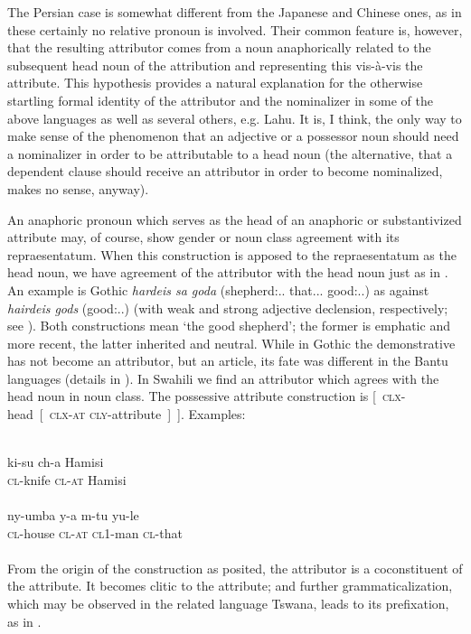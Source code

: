 The Persian case is somewhat different from the Japanese and Chinese ones, as in these certainly no relative pronoun is involved. Their common feature is, however, that the resulting attributor comes from a noun anaphorically related to the subsequent head noun of the attribution and representing this vis-à-vis the attribute. This hypothesis provides a natural explanation for the otherwise startling formal identity of the attributor and the nominalizer in some of the above languages as well as several others, e.g. Lahu. It is, I think, the only way to make sense of the phenomenon that an adjective or a possessor noun should need a nominalizer in order to be attributable to a head noun (the alternative, that a dependent clause should receive an attributor in order to become nominalized, makes no sense, anyway).

An anaphoric pronoun which serves as the head of an anaphoric or substantivized attribute may, of course, show gender or noun class agreement with its repraesentatum. When this construction is apposed to the repraesentatum as the head noun, we have agreement of the attributor with the head noun just as in . An example is Gothic \textit{hardeis sa goda} (shepherd:\textsc{\glnom.\glsg.\glm} that.\textsc{\glnom.\glsg.\glm} good:\textsc{\glnom.\glsg.\glm}) as against \textit{hairdeis gods} (good:\textsc{\glnom.\glsg.\glm}) (with weak and strong adjective declension, respectively; see \citealt[110]{Ramat1980}). Both constructions mean ‘the good shepherd’; the former is emphatic and more recent, the latter inherited and neutral. While in Gothic the demonstrative has not become an attributor, but an article, its fate was different in the Bantu languages (details in \citealt[§7.2]{Lehmann1982b}). In Swahili we find an attributor which agrees with the head noun in noun class. The possessive attribute construction is [~\textsc{clx}-head~[~\textsc{clx}-\textsc{at} \textsc{cly}-attribute~]~]. Examples:

\ea\label{ex:E43}
 \\
 \ea
 \gll  ki-su  ch-a  Hamisi\\
  \textsc{cl}-knife  \textsc{cl}-\textsc{at}  Hamisi\\
\\
\ex
\gll  ny-umba  y-a  m-tu  yu-le\\
\textsc{cl}-house  \textsc{cl}-\textsc{at}  \textsc{cl}1-man  \textsc{cl}-that\\
\\
\z
\z 
\noindent From the origin of the construction as posited, the attributor is a coconstituent of the attribute. It becomes clitic to the attribute; and further grammaticalization, which may be observed in the related language Tswana, leads to its prefixation, as in .

